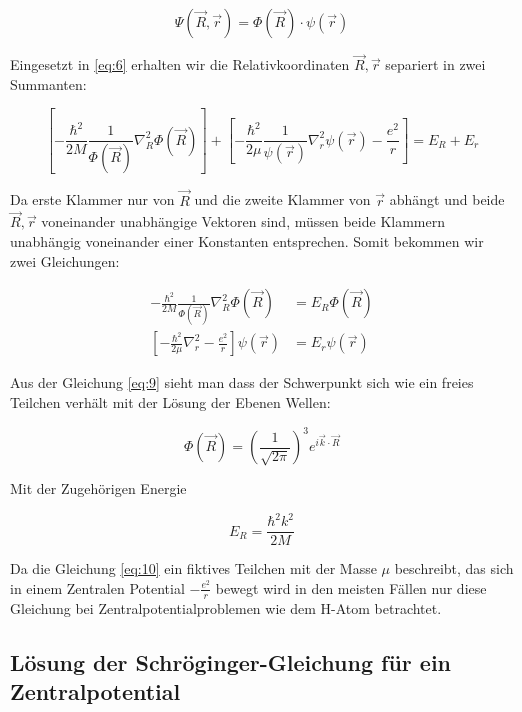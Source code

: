 \begin{equation}
  \label{eq:7}
  \Psi(\vec R,\vec r) = \Phi(\vec R) \cdot \psi(\vec r)
\end{equation}

Eingesetzt in \eqref{eq:6} erhalten wir die Relativkoordinaten \(\vec R,\vec r\) separiert in zwei Summanten:

\begin{equation}
  \label{eq:8}
  \left[-\frac{\hbar^2}{2M}\frac{1}{\Phi(\vec R)}\nabla_R^2\Phi(\vec R)  \right]+\left[-\frac{\hbar^2}{2\mu}\frac{1}{\psi(\vec r)}\nabla_r^2\psi(\vec r) - \frac{e^2}{r} \right] = E_R+E_r
\end{equation}

Da erste Klammer nur von \(\vec R\) und die zweite Klammer von \(\vec r\) abhängt und beide  \(\vec R,\vec r\) voneinander unabhängige Vektoren sind, müssen beide Klammern unabhängig voneinander einer Konstanten entsprechen. Somit bekommen wir zwei Gleichungen:

\begin{align}
 -\frac{\hbar^2}{2M}\frac{1}{\Phi(\vec R)}\nabla_R^2\Phi(\vec R)  &= E_R\Phi(\vec R) \label{eq:9} \\
\left[-\frac{\hbar^2}{2\mu}\nabla_r^2 - \frac{e^2}{r} \right]\psi(\vec r) &= E_r\psi(\vec r) \label{eq:10}
\end{align}

Aus der Gleichung \eqref{eq:9} sieht man dass der Schwerpunkt sich wie ein freies Teilchen verhält mit der Lösung der Ebenen Wellen:

\begin{equation}
  \label{eq:11}
  \Phi(\vec R) = \left( \frac{1}{\sqrt{2\pi}}\right)^3 e^{i\vec k\cdot\vec R}
\end{equation}

Mit der Zugehörigen Energie

\begin{equation}
  \label{eq:12}
  E_R = \frac{\hbar^2k^2}{2M}
\end{equation}

Da die Gleichung \eqref{eq:10} ein fiktives Teilchen mit der Masse \(\mu\) beschreibt, das sich in einem Zentralen Potential \(-\frac{e^2}{r}\) bewegt wird in den meisten Fällen nur diese Gleichung bei Zentralpotentialproblemen wie dem H-Atom betrachtet.

\subsection*{Lösung der Schröginger-Gleichung für ein Zentralpotential}

